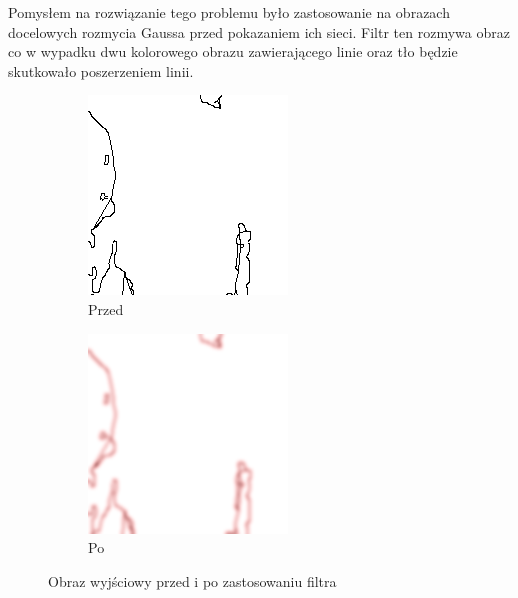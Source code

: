 \documentclass{article}
\begin{document}
Pomysłem na rozwiązanie tego problemu było zastosowanie na obrazach docelowych rozmycia Gaussa przed pokazaniem ich sieci.
Filtr ten rozmywa obraz co w wypadku dwu kolorowego obrazu zawierającego linie oraz tło będzie skutkowało poszerzeniem linii.
\begin{figure}[H]
    \centering
    \begin{subfigure}{0.4\linewidth}
        \includegraphics[width=\linewidth]{images/ex.png}
        \caption{Przed}
    \end{subfigure}
    \begin{subfigure}{0.4\linewidth}
        \includegraphics[width=\linewidth]{images/blur.png}
        \caption{Po}
    \end{subfigure}
    \caption{Obraz wyjściowy przed i po zastosowaniu filtra}
    \label{fig:input_split}
\end{figure}
\end{document}
